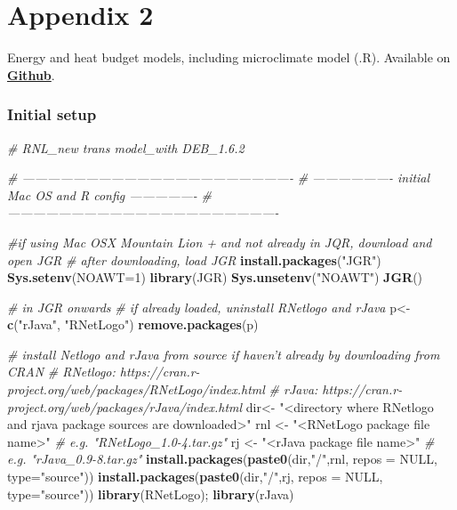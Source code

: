 \documentclass[]{article}
\newenvironment{Shaded}{\begin{snugshade}}{\end{snugshade}}
\newcommand{\KeywordTok}[1]{\textcolor[rgb]{0.13,0.29,0.53}{\textbf{#1}}}
\newcommand{\DataTypeTok}[1]{\textcolor[rgb]{0.13,0.29,0.53}{#1}}
\newcommand{\DecValTok}[1]{\textcolor[rgb]{0.00,0.00,0.81}{#1}}
\newcommand{\StringTok}[1]{\textcolor[rgb]{0.31,0.60,0.02}{#1}}
\newcommand{\CommentTok}[1]{\textcolor[rgb]{0.56,0.35,0.01}{\textit{#1}}}
\newcommand{\OtherTok}[1]{\textcolor[rgb]{0.56,0.35,0.01}{#1}}
\newcommand{\NormalTok}[1]{#1}
\let\oldsubparagraph\subparagraph
\renewcommand{\subparagraph}[1]{\oldsubparagraph{#1}\mbox{}}
\begin{document}
\subparagraph{}\label{section-5}

\section{Appendix 2}\label{appendix-2}

Energy and heat budget models, including microclimate model (.R).
Available on
\href{https://github.com/darwinanddavis/MalishevBullKearney}{\textbf{Github}}.

\subsubsection{Initial setup}\label{initial-setup}

\begin{Shaded}
\begin{Highlighting}[]
\CommentTok{# RNL_new trans model_with DEB_1.6.2}

\CommentTok{# ----------------------------------------------------------------}
\CommentTok{# ------------------- initial Mac OS and R config ----------------}
\CommentTok{# ----------------------------------------------------------------}

\CommentTok{#if using Mac OSX Mountain Lion + and not already in JQR, download and open JGR }
\CommentTok{# after downloading, load JGR}
\KeywordTok{install.packages}\NormalTok{(}\StringTok{"JGR"}\NormalTok{)}
\KeywordTok{Sys.setenv}\NormalTok{(}\DataTypeTok{NOAWT=}\DecValTok{1}\NormalTok{)}
\KeywordTok{library}\NormalTok{(JGR)}
\KeywordTok{Sys.unsetenv}\NormalTok{(}\StringTok{"NOAWT"}\NormalTok{)}
\KeywordTok{JGR}\NormalTok{()}

\CommentTok{# in JGR onwards}
\CommentTok{# if already loaded, uninstall RNetlogo and rJava}
\NormalTok{p<-}\KeywordTok{c}\NormalTok{(}\StringTok{"rJava"}\NormalTok{, }\StringTok{"RNetLogo"}\NormalTok{)}
\KeywordTok{remove.packages}\NormalTok{(p)}

\CommentTok{# install Netlogo and rJava from source if haven't already by downloading from CRAN}
\CommentTok{# RNetlogo: https://cran.r-project.org/web/packages/RNetLogo/index.html}
\CommentTok{# rJava: https://cran.r-project.org/web/packages/rJava/index.html}
\NormalTok{dir<-}\StringTok{ "<directory where RNetlogo and rjava package sources are downloaded>"}
\NormalTok{rnl <-}\StringTok{ "<RNetLogo package file name>"} \CommentTok{# e.g. "RNetLogo_1.0-4.tar.gz" }
\NormalTok{rj <-}\StringTok{ "<rJava package file name>"} \CommentTok{# e.g. "rJava_0.9-8.tar.gz" }
\KeywordTok{install.packages}\NormalTok{(}\KeywordTok{paste0}\NormalTok{(dir,}\StringTok{"/"}\NormalTok{,rnl, }\DataTypeTok{repos =} \OtherTok{NULL}\NormalTok{, }\DataTypeTok{type=}\StringTok{"source"}\NormalTok{))}
\KeywordTok{install.packages}\NormalTok{(}\KeywordTok{paste0}\NormalTok{(dir,}\StringTok{"/"}\NormalTok{,rj, }\DataTypeTok{repos =} \OtherTok{NULL}\NormalTok{, }\DataTypeTok{type=}\StringTok{"source"}\NormalTok{))}
\KeywordTok{library}\NormalTok{(RNetLogo); }\KeywordTok{library}\NormalTok{(rJava)}
\end{Highlighting}
\end{Shaded}
\end{document}
